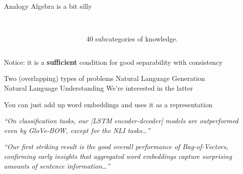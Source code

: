 \documentclass[dvipsnames]{beamer}
\renewcommand{\emph}{\alert}
\newcommand{\countertitle}[1]{\vfill\vfill{\centering \Large \color{bluewrite} #1}\vspace{-0.5cm}}
\newcommand{\mquote}[1]{\textit{``#1''}}
\begin{document}
\begin{frame}{Analogy Algebra is a bit silly}
	\begin{columns}
		\begin{column}{0.5\textwidth}
		\end{column}
		\begin{column}{0.5\textwidth}
			\\
			\vspace{1cm}
			\emph{40 subcategories} of knowledge.
		\end{column}
	\end{columns}
	
	\countertitle{Notice: it is a \textbf{sufficient} condition for good separability with consistency}
\end{frame}

\begin{frame}{Two (overlapping) types of problems}
	\vfill
	{\Huge 
	Natural Language Generation
	}\\
	\vfill
	\vfill
	{\color{bluewrite} \Huge
	Natural Language Understanding
	}
	\countertitle{We're interested in the latter}
\end{frame}

\begin{frame}{You can just add up word embeddings and uses it as a representation}
	\begin{block}{\normalsize {}}
		\mquote{On classification tasks,  our [LSTM encoder-decoder] models
			are outperformed even by GloVe-BOW, except
			for the NLI tasks\ldots}
	\end{block}
	
	\begin{block}{\normalsize {}}
		\mquote{Our first striking result is the good overall performance
			of Bag-of-Vectors, confirming early insights
			that aggregated word embeddings capture
			surprising amounts of sentence information\ldots}
	\end{block}
\end{frame}
\end{document}
